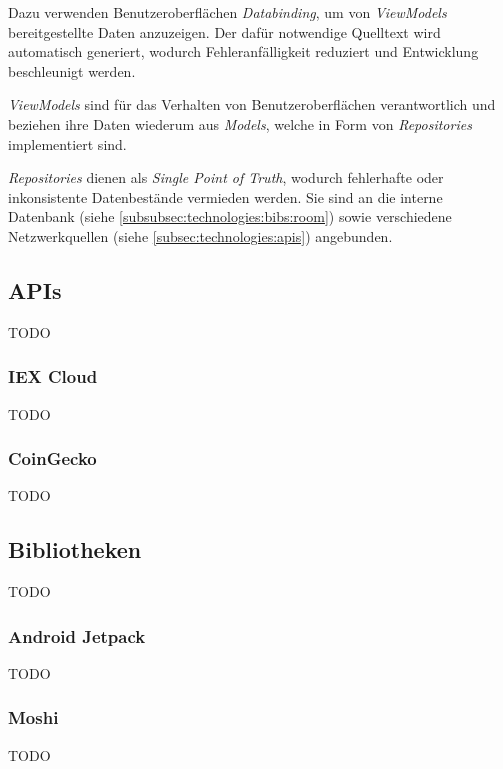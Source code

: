 \documentclass[a4paper]{article}
\begin{document}
Dazu verwenden Benutzeroberflächen \textit{Databinding}, um von \textit{ViewModels} bereitgestellte Daten anzuzeigen.
Der dafür notwendige Quelltext wird automatisch generiert, wodurch Fehleranfälligkeit reduziert und Entwicklung beschleunigt werden.

\textit{ViewModels} sind für das Verhalten von Benutzeroberflächen verantwortlich und beziehen ihre Daten wiederum aus \textit{Models}, welche in Form von \textit{Repositories} implementiert sind.

\textit{Repositories} dienen als \textit{Single Point of Truth}, wodurch fehlerhafte oder inkonsistente Datenbestände vermieden werden.
Sie sind an die interne Datenbank (siehe \autoref{subsubsec:technologies:bibs:room}) sowie verschiedene Netzwerkquellen (siehe \autoref{subsec:technologies:apis}) angebunden.


\subsection{APIs}
\label{subsec:technologies:apis}
TODO


\subsubsection{IEX Cloud}
\label{subsubsec:technologies:apis:iex}
TODO


\subsubsection{CoinGecko}
\label{subsubsec:technologies:apis:coingecko}
TODO


\subsection{Bibliotheken}
\label{subsec:technologies:bibs}
TODO


\subsubsection{Android Jetpack}
\label{subsubsec:technologies:bibs:jetpack}
TODO


\subsubsection{Moshi}
\label{subsubsec:technologies:bibs:moshi}
TODO
\end{document}
